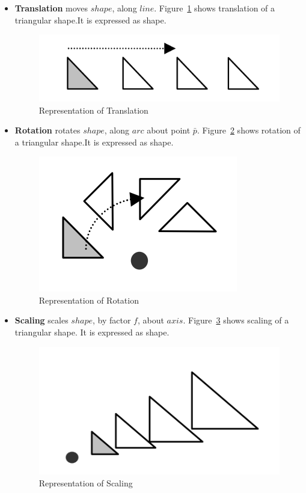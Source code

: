 \begin{itemize}[noitemsep,topsep=2pt,parsep=2pt,partopsep=2pt]
\item {\bf Translation} moves $shape$, along $line$. Figure~\ref{fig:abstraction:hodatrans} shows translation of a triangular shape.It is expressed as 
 {shape}. 


\begin{figure}[!h]
\centering 
\includegraphics[width=0.35\linewidth]{../Common/images/hodatranslationterse} 
\caption{Representation of Translation}
\label{fig:abstraction:hodatrans}
\end{figure}



\item{\bf Rotation} rotates $shape$, along $arc$ about point $\bar{p}$.  Figure~\ref{fig:abstraction:hodarot} shows rotation of a triangular shape.It is expressed as 	
 {shape}.
	
%

\begin{figure}[!h]
\centering 
\includegraphics[width=0.35\linewidth]{../Common/images/hodarotation} 
\caption{Representation of Rotation}
\label{fig:abstraction:hodarot}
\end{figure}





\item {\bf Scaling} scales $shape$, by factor  $f$, about $axis$.  Figure~\ref{fig:abstraction:hodascale} shows scaling of a triangular shape. It is expressed as 
 {shape}.

\begin{figure}[!h]
\centering 
\includegraphics[width=0.35\linewidth]{../Common/images/hodascaling} 
\caption{Representation of Scaling}
\label{fig:abstraction:hodascale}
\end{figure}


\end{itemize}


